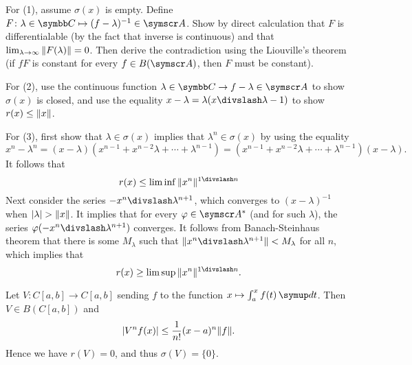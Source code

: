 \begin{sketch}
  For (1), assume $\sigma(x)$ is empty. Define $F\colon \lambda\in\CC\mapsto (f-\lambda)^{-1}\in \BA A$. Show by direct calculation that $F$ is differentialable (by the fact that inverse is continuous) and that $\lim_{\lambda\to\infty} \Vert F(\lambda)\Vert=0$. Then derive the contradiction using the Liouville's theorem (if $fF$ is constant for every $f\in B(\BA A)$, then $F$ must be constant).

  For (2), use the continuous function $\lambda\in\CC\to f-\lambda\in\BA A$ to show $\sigma(x)$ is closed, and use the equality $x-\lambda=\lambda(x\DIV\lambda-1)$ to show $r(x)\leq \Vert x\Vert$.

  For (3), first show that $\lambda\in\sigma(x)$ implies that $\lambda^n\in\sigma(x)$ by using the equality
  \begin{equation*}
    x^n-\lambda^n = (x-\lambda)(x^{n-1}+x^{n-2}\lambda+\dotsb+\lambda^{n-1}) = (x^{n-1}+x^{n-2}\lambda+\dotsb+\lambda^{n-1})(x-\lambda).
  \end{equation*}
  It follows that
  \begin{equation*}
    r(x)\leq \liminf \NORM{x^n}^{1\DIV n}
  \end{equation*}
  Next consider the series $-x^n\DIV \lambda^{n+1}$, which converges to $(x-\lambda)^{-1}$ when $\vert\lambda\vert>\Vert x\Vert$. It implies that for every $\varphi\in\BA A^*$ (and for such $\lambda$), the series $\varphi(-x^n\DIV \lambda^{n+1})$ converges. It follows from Banach-Steinhaus theorem that there is some $M_\lambda$ such that $\NORM{x^n\DIV \lambda^{n+1}}<M_\lambda$ for all $n$, which implies that
  \begin{equation*}
    r(x)\geq \limsup\NORM{x^n}^{1\DIV n}.
  \end{equation*}
\end{sketch}

\begin{example}
  Let $V\colon C[a, b]\to C[a, b]$ sending $f$ to the function $x\mapsto \int_a^x f(t)\DIFF t$. Then $V\in B(C[a, b])$ and
  \begin{equation*}
    \vert V^nf(x)\vert\leq\frac1{n!}(x-a)^n\Vert f\Vert.
  \end{equation*}
  Hence we have $r(V)=0$, and thus $\sigma(V)=\{0\}$.
\end{example}

